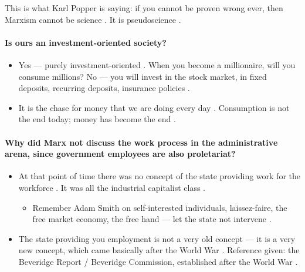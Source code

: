 \begin{CriticalPoint}
This is what Karl Popper is saying: if you cannot be proven wrong ever, then Marxism cannot be science . It is pseudoscience .
\end{CriticalPoint}

\paragraph{Is ours an investment-oriented society?}
\begin{itemize}
    \item Yes --- purely investment-oriented . When you become a millionaire, will you consume millions? No --- you will invest in the stock market, in fixed deposits, recurring deposits, insurance policies .
    \item It is the chase for money that we are doing every day . Consumption is not the end today; money has become the end .
\end{itemize}

\paragraph{Why did Marx not discuss the work process in the administrative arena, since government employees are also proletariat?}
\begin{itemize}
    \item At that point of time there was no concept of the state providing work for the workforce . It was all the industrial capitalist class .
    \begin{itemize}
        \item Remember Adam Smith on self-interested individuals, laissez-faire, the free market economy, the free hand --- let the state not intervene .
    \end{itemize}
    \item The state providing you employment is not a very old concept --- it is a very new concept, which came basically after the World War . Reference given: the Beveridge Report / Beveridge Commission, established after the World War .
\end{itemize}

